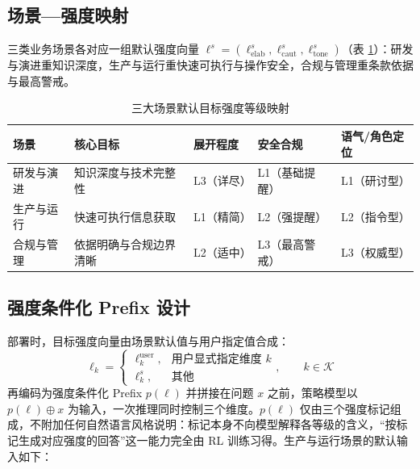 \documentclass[fontset=fandol,type=master,campus=shenzhen,etitleauto=true]{hithesisbook}
\begin{document}
\subsection{场景---强度映射}\label{ux573aux666fux5f3aux5ea6ux6620ux5c04}

三类业务场景各对应一组默认强度向量 $\boldsymbol{\ell}^{s} = (\ell^{s}_{\text{elab}}, \ell^{s}_{\text{caut}}, \ell^{s}_{\text{tone}})$（表 \ref{tab:scene-intensity-map}）：研发与演进重知识深度，生产与运行重快速可执行与操作安全，合规与管理重条款依据与最高警戒。

\begin{table}[htbp]
\centering
\caption{三大场景默认目标强度等级映射}
\label{tab:scene-intensity-map}
\small
\renewcommand{\arraystretch}{1.1}
\begin{tabular}{p{2.2cm}p{3.0cm}p{1.6cm}p{2.4cm}p{2.6cm}}
\toprule
\textbf{场景} & \textbf{核心目标} & \textbf{展开程度} & \textbf{安全合规} & \textbf{语气/角色定位} \\
\midrule
研发与演进 & 知识深度与技术完整性 & L3（详尽） & L1（基础提醒） & L1（研讨型） \\
生产与运行 & 快速可执行信息获取 & L1（精简） & L2（强提醒） & L2（指令型） \\
合规与管理 & 依据明确与合规边界清晰 & L2（适中） & L3（最高警戒） & L3（权威型） \\
\bottomrule
\end{tabular}
\end{table}

\subsection{强度条件化 Prefix 设计}\label{ux5f3aux5ea6ux6761ux4ef6ux5316-prefix-ux8bbeux8ba1}

部署时，目标强度向量由场景默认值与用户指定值合成：
\begin{equation}\label{eq:target-intensity}
\ell_k = \begin{cases} \ell_k^{\text{user}}, & \text{用户显式指定维度 } k \\ \ell_k^{s}, & \text{其他} \end{cases}, \qquad k \in \mathcal{K}
\end{equation}
再编码为强度条件化 Prefix $p(\boldsymbol{\ell})$ 并拼接在问题 $x$ 之前，策略模型以 $p(\boldsymbol{\ell}) \oplus x$ 为输入，一次推理同时控制三个维度。$p(\boldsymbol{\ell})$ 仅由三个强度标记组成，不附加任何自然语言风格说明：标记本身不向模型解释各等级的含义，“按标记生成对应强度的回答”这一能力完全由 RL 训练习得。生产与运行场景的默认输入如下：
\end{document}
